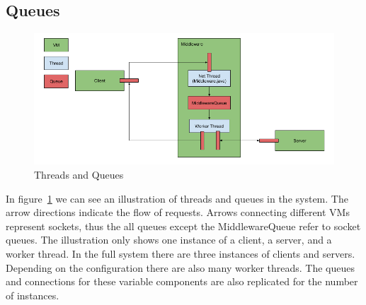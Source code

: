 \documentclass[11pt,a4paper]{article}
\begin{document}
\subsection{Queues}
%
\begin{figure}[H]
    \includegraphics[width=\linewidth]{../illustrations/threads_and_queues.png}
    \caption{Threads and Queues}
    \label{fig:threads_and_queues}
\end{figure}
%
In figure~\ref{fig:threads_and_queues} we can see an illustration of threads and queues in the system.
%
The arrow directions indicate the flow of requests.
%
Arrows connecting different VMs represent sockets, thus the all queues except the MiddlewareQueue refer to socket queues.
%
The illustration only shows one instance of a client, a server, and a worker thread.
%
In the full system there are three instances of clients and servers.
%
Depending on the configuration there are also many worker threads.
%
The queues and connections for these variable components are also replicated for the number of instances.
%
\end{document}
